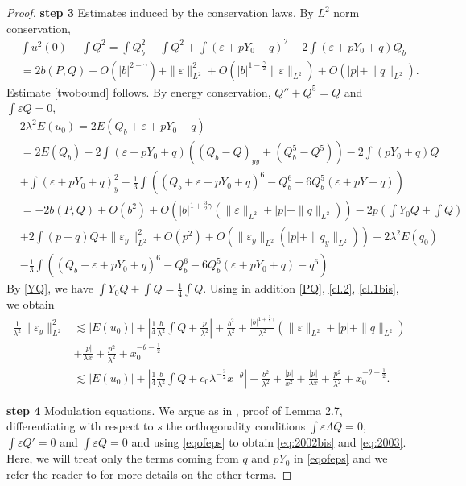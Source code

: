 \documentclass[11pt,a4paper,reqno]{amsart}
\theoremstyle{remark}
\numberwithin{equation}{section}
\def\e{\varepsilon}
\def\l{\lambda}
\def\Yz{Y_0}
\begin{document}
\begin{proof}
{\bf step 3}  Estimates induced by the conservation laws.
By $L^2$ norm conservation,
\begin{align*}
& \int u^2(0) - \int Q^2  = \int Q_b^2 - \int Q^2 + \int (\e+p\Yz+q)^2 + 2 \int (\e+p\Yz +q) Q_b\\
&= 2 b(P,Q) + O(|b|^{2-\gamma}) +\|\e\|_{L^2}^2 + O(|b|^{1-\frac \gamma 2}\|\e\|_{L^2}) +O(|p|+   \|q\|_{L^2}).
\end{align*}
Estimate \eqref{twobound} follows. By energy conservation, $Q''+Q^5= Q$  and $\int \e Q=0$,
\begin{align*} & 2 \l^2 E(u_0)   = 2 E(Q_b + \e + p\Yz +q) \\& = 2 E(Q_b) - 2 \int (\e+p\Yz + q) \left( (Q_b-Q)_{yy}+ (Q_b^5 - Q^5) \right)
- 2 \int (p\Yz + q) Q \\ &+ \int (\e+p\Yz + q)_y^2 - \frac 13 \int \left( (Q_b+\e+p\Yz + q)^6 - Q_b^6 - 6 Q_b^5(\e+pY+q)\right)\\
& = - 2 b (P,Q) + O(b^2) 
+ O\left( |b|^{1+\frac 32 \gamma} \left( \|\e\|_{L^2} + |p| + \|q\|_{L^2}\right)\right) - 2 p \left( \int \Yz Q + \int Q\right)
\\ &+ 2 \int (p-q) Q + \|\e_y\|_{L^2}^2  + O(p^2) + O\left(\|\e_y\|_{L^2}(|p|+ \|q_y\|_{L^2})\right) + 2\l^2 E(q_0)
\\ &- \frac 13 \int \left( (Q_b+\e+p\Yz+q)^6 - Q_b^6 - 6Q_b^5 (\e+p\Yz+q) -q^6\right)
\end{align*}
By \eqref{YQ}, we have $\int \Yz Q + \int Q = \frac 14 \int Q$. Using in addition \eqref{PQ}, \eqref{cl.2}, \eqref{cl.1bis}, we obtain
\begin{align*}
\frac 1{\l^2}\|\e_y\|_{L^2}^2 & \lesssim |E(u_0)| + \left| \frac 14 \frac b{\l^2} \int Q + \frac p{\l^2}\right| 
+ \frac {b^2}{\l^2}+  \frac {|b|^{1+\frac 32 \gamma}}{\l^2} \left( \|\e\|_{L^2} + |p| + \|q\|_{L^2}\right) \\
 & + \frac { |p| }{\l x}  + \frac {p^2}{\l^2}  +  x_0^{-\theta-\frac 12}\\
 & \lesssim |E(u_0)| + \left| \frac 14 \frac b{\l^2} \int Q + c_0 \l^{-\frac 32} x^{-\theta} \right|  
+ \frac {b^2}{\l^2}+  
 \frac { |p| }{x^2} + \frac { |p| }{\l x}  + \frac {p^2}{\l^2}  +  x_0^{-\theta-\frac 12} 
  .
\end{align*}

\medskip

{\bf step 4} Modulation equations. We argue as in \cite{MMR1}, proof of Lemma 2.7, differentiating with respect to $s$ the orthogonality conditions $\int \e \Lambda Q=0$, $\int \e Q'=0$ and 
$\int \e Q=0$ and using \eqref{eqofeps} to obtain   \eqref{eq:2002bis}
and \eqref{eq:2003}.
Here, we  will  treat only  the   terms  coming from $q$ and $p\Yz$ in \eqref{eqofeps} and we refer the reader to \cite{MMR1} for more details on the other terms.
\medskip



\end{proof}
\end{document}
